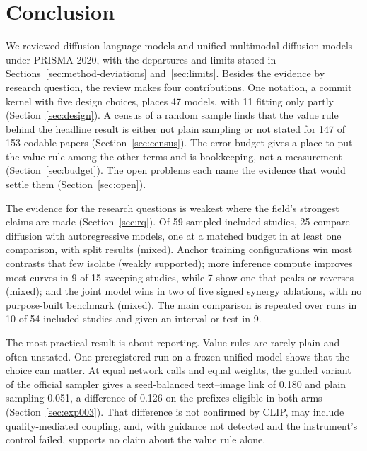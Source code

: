 \section{Conclusion}
\label{sec:conclusion}

We reviewed diffusion language models and unified multimodal diffusion models under PRISMA 2020, with the departures and limits stated in Sections~\ref{sec:method-deviations} and~\ref{sec:limits}. Besides the evidence by research question, the review makes four contributions. One notation, a commit kernel with five design choices, places 47 models, with 11 fitting only partly (Section~\ref{sec:design}). A census of a random sample finds that the value rule behind the headline result is either not plain sampling or not stated for 147 of 153 codable papers (Section~\ref{sec:census}). The error budget gives a place to put the value rule among the other terms and is bookkeeping, not a measurement (Section~\ref{sec:budget}). The open problems each name the evidence that would settle them (Section~\ref{sec:open}). %

The evidence for the research questions is weakest where the field's strongest claims are made (Section~\ref{sec:rq}). Of 59 sampled included studies, 25 compare diffusion with autoregressive models, one at a matched budget in at least one comparison, with split results (mixed). Anchor training configurations win most contrasts that few isolate (weakly supported); more inference compute improves most curves in 9 of 15 sweeping studies, while 7 show one that peaks or reverses (mixed); and the joint model wins in two of five signed synergy ablations, with no purpose-built benchmark (mixed). The main comparison is repeated over runs in 10 of 54 included studies and given an interval or test in 9. %

The most practical result is about reporting. Value rules are rarely plain and often unstated. One preregistered run on a frozen unified model shows that the choice can matter. At equal network calls and equal weights, the guided variant of the official sampler gives a seed-balanced text--image link of 0.180 and plain sampling 0.051, a difference of 0.126 on the prefixes eligible in both arms (Section~\ref{sec:exp003}). That difference is not confirmed by CLIP, may include quality-mediated coupling, and, with guidance not detected and the instrument's control failed, supports no claim about the value rule alone. %

